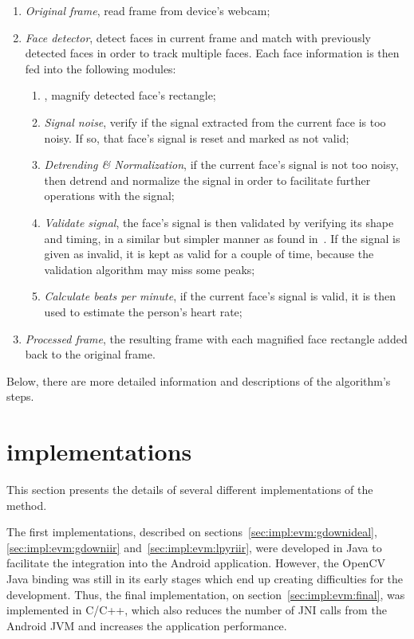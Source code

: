 \begin{enumerate}
  \item \emph{Original frame}, read frame from device's webcam;
  \item \emph{Face detector}, detect faces in current frame and match with
        previously detected faces in order to track multiple faces.
        Each face information is then fed into the following modules:
  \begin{enumerate}
    \item \emph{\evm}, magnify detected face's rectangle;
    \item \emph{Signal noise}, verify if the signal extracted from the
          current face is too noisy. If so, that face's signal is reset
          and marked as not valid;
    \item \emph{Detrending \& Normalization}, if the current face's signal is
          not too noisy, then detrend and normalize the signal in order to
          facilitate further operations with the signal;
    \item \emph{Validate signal}, the face's signal is then validated by
          verifying its shape and timing, in a similar but simpler manner as
          found in~\cite{Nenova2010Automated}. If the signal is given as
          invalid, it is kept as valid for a couple of time, because the
          validation algorithm may miss some peaks;
    \item \emph{Calculate beats per minute}, if the current face's signal is
          valid, it is then used to estimate the person's heart rate;
  \end{enumerate}
  \item \emph{Processed frame}, the resulting frame with each magnified face
        rectangle added back to the original frame.
\end{enumerate}

Below, there are more detailed information and descriptions of the 
algorithm's steps.

\section{\evm{} implementations} \label{sec:impl:evm}


This section presents the details of several different implementations of the
\evm{} method.

The first implementations, described on sections~\ref{sec:impl:evm:gdownideal},
\ref{sec:impl:evm:gdowniir} and~\ref{sec:impl:evm:lpyriir},
were developed in Java to facilitate the integration into the Android
application. However, the OpenCV Java binding was still in its early stages
which end up creating difficulties for the development. Thus, the final
implementation, on section~\ref{sec:impl:evm:final}, was implemented in C/C++,
which also reduces the number of JNI calls from the Android JVM and
increases the application performance.

